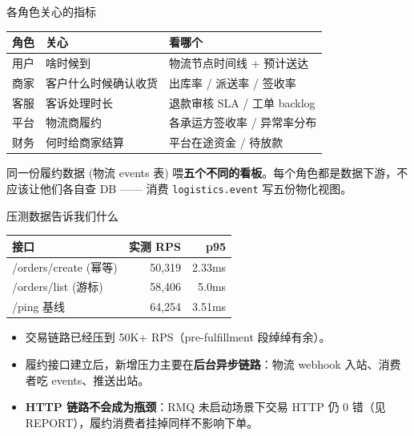 \begin{frame}{各角色关心的指标}
\begin{tabular}{@{}lll@{}}
\toprule
角色 & 关心 & 看哪个 \\
\midrule
用户   & 啥时候到                  & 物流节点时间线 + 预计送达 \\
商家   & 客户什么时候确认收货      & 出库率 / 派送率 / 签收率 \\
客服   & 客诉处理时长              & 退款审核 SLA / 工单 backlog \\
平台   & 物流商履约              & 各承运方签收率 / 异常率分布 \\
财务   & 何时给商家结算            & 平台在途资金 / 待放款 \\
\bottomrule
\end{tabular}
\vspace{2mm}
\small 同一份履约数据 (物流 events 表) 喂\textbf{五个不同的看板}。每个角色都是数据下游，不应该让他们各自查 DB —— 消费 \texttt{logistics.event} 写五份物化视图。
\end{frame}

\begin{frame}{压测数据告诉我们什么}
\begin{tabular}{@{}lrr@{}}
\toprule
接口 & 实测 RPS & p95 \\
\midrule
/orders/create (幂等)  & 50{,}319 & 2.33ms \\
/orders/list (游标)    & 58{,}406 & 5.0ms  \\
/ping 基线             & 64{,}254 & 3.51ms \\
\bottomrule
\end{tabular}
\vspace{2mm}
\begin{itemize}
  \item 交易链路已经压到 50K+ RPS（pre-fulfillment 段绰绰有余）。
  \item 履约接口建立后，新增压力主要在\textbf{后台异步链路}：物流 webhook 入站、消费者吃 events、推送出站。
  \item \textbf{HTTP 链路不会成为瓶颈}：RMQ 未启动场景下交易 HTTP 仍 0 错（见 REPORT），履约消费者挂掉同样不影响下单。
\end{itemize}
\end{frame}

